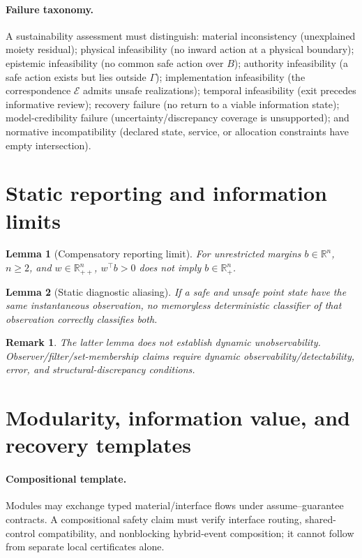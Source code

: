 \documentclass[11pt]{article}
\newtheorem{lemma}{Lemma}
\newtheorem{remark}{Remark}
\begin{document}
\paragraph{Failure taxonomy.} A sustainability assessment must distinguish: material inconsistency (unexplained moiety residual); physical infeasibility (no inward action at a physical boundary); epistemic infeasibility (no common safe action over $B$); authority infeasibility (a safe action exists but lies outside $\Gamma$); implementation infeasibility (the correspondence $\mathcal E$ admits unsafe realizations); temporal infeasibility (exit precedes informative review); recovery failure (no return to a viable information state); model-credibility failure (uncertainty/discrepancy coverage is unsupported); and normative incompatibility (declared state, service, or allocation constraints have empty intersection).

\section{Static reporting and information limits}
\begin{lemma}[Compensatory reporting limit]
For unrestricted margins $b\in\mathbb R^n$, $n\ge2$, and $w\in\mathbb R_{++}^n$, $w^\top b>0$ does not imply $b\in\mathbb R_+^n$.
\end{lemma}
\begin{lemma}[Static diagnostic aliasing]
If a safe and unsafe point state have the same instantaneous observation, no memoryless deterministic classifier of that observation correctly classifies both.
\end{lemma}
\begin{remark}
The latter lemma does not establish dynamic unobservability. Observer/filter/set-membership claims require dynamic observability/detectability, error, and structural-discrepancy conditions.
\end{remark}

\section{Modularity, information value, and recovery templates}
\paragraph{Compositional template.} Modules may exchange typed material/interface flows under assume--guarantee contracts. A compositional safety claim must verify interface routing, shared-control compatibility, and nonblocking hybrid-event composition; it cannot follow from separate local certificates alone.
\end{document}
